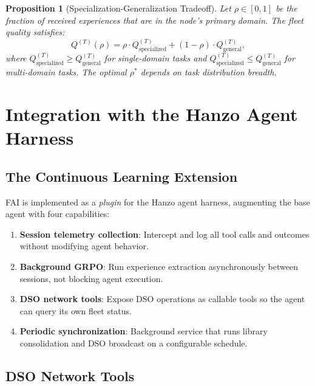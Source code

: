 \documentclass[11pt]{article}
\newtheorem{proposition}[theorem]{Proposition}
\begin{document}
\begin{proposition}[Specialization-Generalization Tradeoff]
\label{prop:tradeoff}
Let $\rho \in [0,1]$ be the fraction of received experiences that are in the
node's primary domain. The fleet quality satisfies:
\begin{equation}
    Q^{(T)}(\rho) = \rho \cdot Q_{\text{specialized}}^{(T)}
                  + (1 - \rho) \cdot Q_{\text{general}}^{(T)},
\end{equation}
where $Q_{\text{specialized}}^{(T)} \geq Q_{\text{general}}^{(T)}$ for
single-domain tasks and $Q_{\text{specialized}}^{(T)} \leq Q_{\text{general}}^{(T)}$
for multi-domain tasks. The optimal $\rho^*$ depends on task distribution breadth.
\end{proposition}

\section{Integration with the Hanzo Agent Harness}
\label{sec:harness}

\subsection{The Continuous Learning Extension}

FAI is implemented as a \emph{plugin} for the Hanzo agent harness,
augmenting the base agent with four capabilities:
\begin{enumerate}[leftmargin=1.5em]
    \item \textbf{Session telemetry collection}: Intercept and log all tool
          calls and outcomes without modifying agent behavior.
    \item \textbf{Background GRPO}: Run experience extraction asynchronously
          between sessions, not blocking agent execution.
    \item \textbf{DSO network tools}: Expose DSO operations as callable tools
          so the agent can query its own fleet status.
    \item \textbf{Periodic synchronization}: Background service that runs
          library consolidation and DSO broadcast on a configurable schedule.
\end{enumerate}

\subsection{DSO Network Tools}
\end{document}
